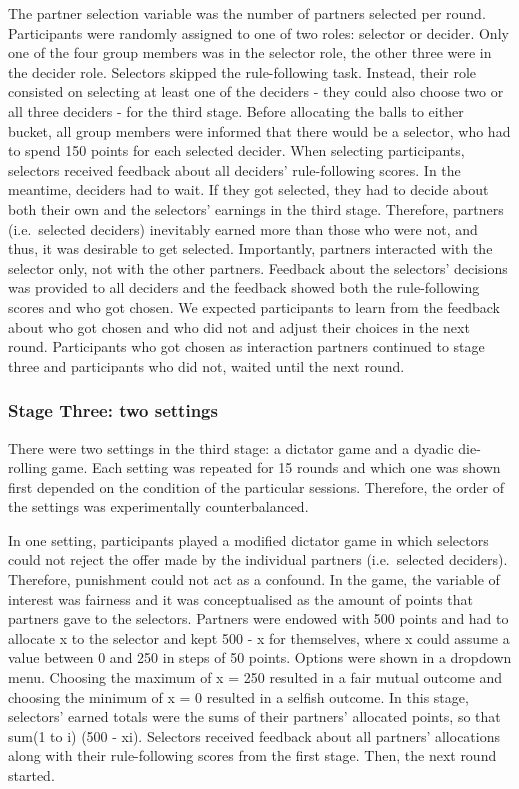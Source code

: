 \documentclass[man]{apa6}
\begin{document}
The partner selection variable was the number of partners selected per
round. Participants were randomly assigned to one of two roles: selector
or decider. Only one of the four group members was in the selector role,
the other three were in the decider role. Selectors skipped the
rule-following task. Instead, their role consisted on selecting at least
one of the deciders - they could also choose two or all three deciders -
for the third stage. Before allocating the balls to either bucket, all
group members were informed that there would be a selector, who had to
spend 150 points for each selected decider. When selecting participants,
selectors received feedback about all deciders' rule-following scores.
In the meantime, deciders had to wait. If they got selected, they had to
decide about both their own and the selectors' earnings in the third
stage. Therefore, partners (i.e.~selected deciders) inevitably earned
more than those who were not, and thus, it was desirable to get
selected. Importantly, partners interacted with the selector only, not
with the other partners. Feedback about the selectors' decisions was
provided to all deciders and the feedback showed both the rule-following
scores and who got chosen. We expected participants to learn from the
feedback about who got chosen and who did not and adjust their choices
in the next round. Participants who got chosen as interaction partners
continued to stage three and participants who did not, waited until the
next round.

\hypertarget{stage-three-two-settings}{%
\subsubsection{Stage Three: two
settings}\label{stage-three-two-settings}}

There were two settings in the third stage: a dictator game and a dyadic
die-rolling game. Each setting was repeated for 15 rounds and which one
was shown first depended on the condition of the particular sessions.
Therefore, the order of the settings was experimentally counterbalanced.

In one setting, participants played a modified dictator game in which
selectors could not reject the offer made by the individual partners
(i.e.~selected deciders). Therefore, punishment could not act as a
confound. In the game, the variable of interest was fairness and it was
conceptualised as the amount of points that partners gave to the
selectors. Partners were endowed with 500 points and had to allocate x
to the selector and kept 500 - x for themselves, where x could assume a
value between 0 and 250 in steps of 50 points. Options were shown in a
dropdown menu. Choosing the maximum of x = 250 resulted in a fair mutual
outcome and choosing the minimum of x = 0 resulted in a selfish outcome.
In this stage, selectors' earned totals were the sums of their partners'
allocated points, so that sum(1 to i) (500 - xi). Selectors received
feedback about all partners' allocations along with their rule-following
scores from the first stage. Then, the next round started.
\end{document}

